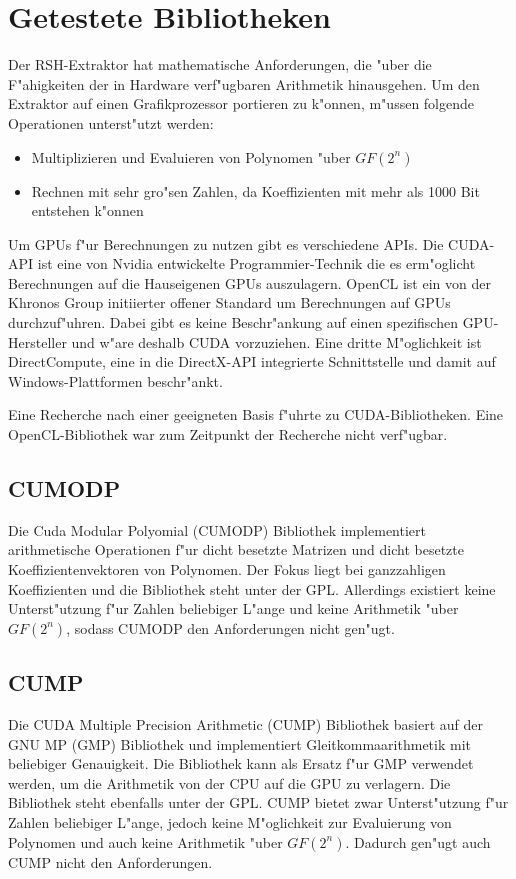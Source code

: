 \section{Getestete Bibliotheken}
\label{Bibliotheken}

Der RSH-Extraktor hat mathematische Anforderungen, die "uber die F"ahigkeiten der in Hardware verf"ugbaren Arithmetik hinausgehen. Um den Extraktor auf einen Grafikprozessor portieren zu k"onnen, m"ussen folgende Operationen unterst"utzt werden:
\begin{itemize}
	\item Multiplizieren und Evaluieren von Polynomen "uber $GF(2^n)$
	\item Rechnen mit sehr gro"sen Zahlen, da Koeffizienten mit mehr als 1000 Bit entstehen k"onnen
\end{itemize}

Um GPUs f"ur Berechnungen zu nutzen gibt es verschiedene APIs. Die CUDA-API ist eine von Nvidia entwickelte Programmier-Technik die es erm"oglicht Berechnungen auf die Hauseigenen GPUs auszulagern. OpenCL ist ein von der Khronos Group initiierter offener Standard um Berechnungen auf GPUs durchzuf"uhren. Dabei gibt es keine Beschr"ankung auf einen spezifischen GPU-Hersteller und w"are deshalb CUDA vorzuziehen. Eine dritte M"oglichkeit ist DirectCompute, eine in die DirectX-API integrierte Schnittstelle und damit auf Windows-Plattformen beschr"ankt.

Eine Recherche nach einer geeigneten Basis f"uhrte zu CUDA-Bibliotheken. Eine OpenCL-Bibliothek war zum Zeitpunkt der Recherche nicht verf"ugbar.

\subsection{CUMODP}
Die Cuda Modular Polyomial (CUMODP) Bibliothek implementiert arithmetische Operationen f"ur dicht besetzte Matrizen und dicht besetzte Koeffizientenvektoren von Polynomen. Der Fokus liegt bei ganzzahligen Koeffizienten und die Bibliothek steht unter der GPL.
Allerdings existiert keine Unterst"utzung f"ur Zahlen beliebiger L"ange und keine Arithmetik "uber $GF(2^n)$, sodass CUMODP den Anforderungen nicht gen"ugt.

\subsection{CUMP}
Die CUDA Multiple Precision Arithmetic (CUMP) Bibliothek basiert auf der GNU MP (GMP) Bibliothek und implementiert Gleitkommaarithmetik mit beliebiger Genauigkeit. Die Bibliothek kann als Ersatz f"ur GMP verwendet werden, um die Arithmetik von der CPU auf die GPU zu verlagern. Die Bibliothek steht ebenfalls unter der GPL.
CUMP bietet zwar Unterst"utzung f"ur Zahlen beliebiger L"ange, jedoch keine M"oglichkeit zur Evaluierung von Polynomen und auch keine Arithmetik "uber $GF(2^n)$. Dadurch gen"ugt auch CUMP nicht den Anforderungen.


